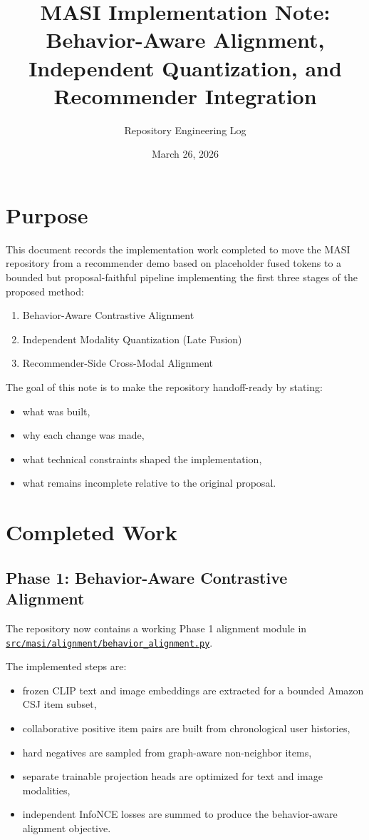 \documentclass[11pt]{article}
\title{MASI Implementation Note:\\
Behavior-Aware Alignment, Independent Quantization, and Recommender Integration}
\author{Repository Engineering Log}
\date{March 26, 2026}
\begin{document}
\maketitle

\section{Purpose}
This document records the implementation work completed to move the MASI repository from a recommender demo based on placeholder fused tokens to a bounded but proposal-faithful pipeline implementing the first three stages of the proposed method:
\begin{enumerate}[leftmargin=1.5em]
    \item Behavior-Aware Contrastive Alignment
    \item Independent Modality Quantization (Late Fusion)
    \item Recommender-Side Cross-Modal Alignment
\end{enumerate}

The goal of this note is to make the repository handoff-ready by stating:
\begin{itemize}[leftmargin=1.5em]
    \item what was built,
    \item why each change was made,
    \item what technical constraints shaped the implementation,
    \item what remains incomplete relative to the original proposal.
\end{itemize}

\section{Completed Work}
\subsection{Phase 1: Behavior-Aware Contrastive Alignment}
The repository now contains a working Phase 1 alignment module in
\href{/Users/pradyundevarakonda/Developer/MASI/src/masi/alignment/behavior_alignment.py}{\texttt{src/masi/alignment/behavior\_alignment.py}}.

The implemented steps are:
\begin{itemize}[leftmargin=1.5em]
    \item frozen CLIP text and image embeddings are extracted for a bounded Amazon CSJ item subset,
    \item collaborative positive item pairs are built from chronological user histories,
    \item hard negatives are sampled from graph-aware non-neighbor items,
    \item separate trainable projection heads are optimized for text and image modalities,
    \item independent InfoNCE losses are summed to produce the behavior-aware alignment objective.
\end{itemize}
\end{document}
